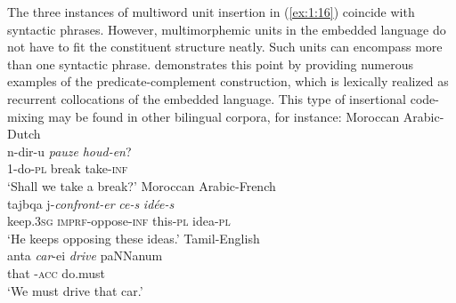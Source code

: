 The three instances of multiword unit insertion in (\ref{ex:1:16}) coincide with syntactic phrases. However, multimorphemic units in the embedded language do not have to fit the constituent structure neatly. Such units can encompass more than one syntactic phrase. \citet{backus-units-2003} demonstrates this point by providing numerous examples of the predicate-complement construction, which is lexically realized as recurrent collocations of the embedded language. This type of insertional code-mixing may be found in other bilingual corpora, for instance:
\ea \label{ex:1:17}
Moroccan Arabic-Dutch \citep[245]{boumans-syntax-1998}\\
\gll n-dir-u \textit{pauze} \textit{houd-en}?\\
1-do-\textsc{pl} break take-\textsc{inf}\\
\glt `Shall we take a break?'
\ex \label{ex:1:18}
Moroccan Arabic-French \citep[315]{bentahila-davies-1983}\\
\gll tajbqa j-\textit{confront-er} \textit{ce-s} \textit{idée-s}\\
keep.\textsc{3sg} \textsc{imprf}-oppose-\textsc{inf} this-\textsc{pl} idea-\textsc{pl}\\
\glt `He keeps opposing these ideas.'
\ex \label{ex:1:19}
Tamil-English \citep[80]{sankoff-et-al-1990}\\
\gll anta  \textit{car}-ei \textit{drive} paNNanum\\
that { \hspace{4mm}-\textsc{acc}} {} do.must\\
\glt `We must drive that car.'
\z

